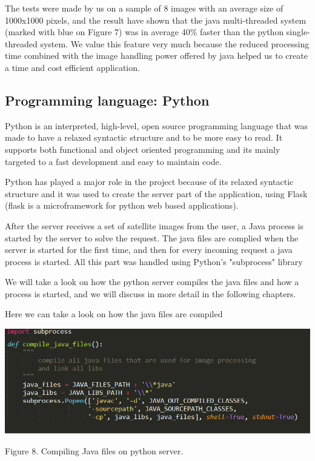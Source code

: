 \documentclass[12pt, a4paper]{report}
\begin{document}
\quad
The tests were made by us on a sample of 8 images with an average size of 1000x1000 pixels, and the result have shown that the java multi-threaded system (marked with blue on Figure 7) was in average 40\% faster than the python single-threaded system. We value this feature very much because the reduced processing time combined with the image handling power offered by java helped us to create a time and cost efficient application.


\subsection{Programming language: Python}
\medskip

\quad
Python is an interpreted, high-level, open source programming language that was made to have a relaxed syntactic structure and to be more easy to read. It supports both functional and object oriented programming and its mainly targeted to a fast development and easy to maintain code.
\par

Python has played a major role in the project because of its relaxed syntactic structure and it was used to create the server part of the application, using Flask (flask is a microframework for python web based applications).
\par 

After the server receives a set of satellite images from the user, a Java process is started by the server to solve the request. The java files are complied when the server is started for the first time, and then for every incoming request a java process is started. All this part was handled using Python's "subprocess" library
\par
\medskip

We will take a look on how the python server compiles the java files and how a process is started, and we will discuss in more detail in the following chapters.
\medskip

Here we can take a look on how the java files are compiled
\par
\bigskip
\includegraphics[scale=0.8, center]{python_call_java_1.png}
\begin{center}
Figure 8. Compiling Java files on python server.
\end{center}
\end{document}
